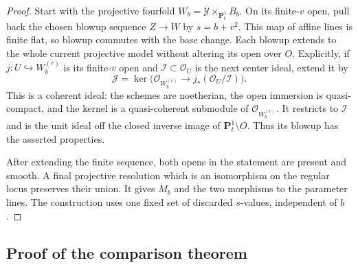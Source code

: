 \documentclass[11pt]{amsart}
\newcommand{\PP}{\mathbf P}
\theoremstyle{definition}
\theoremstyle{remark}
\numberwithin{equation}{section}
\begin{document}
\begin{proof}
Start with the projective fourfold
$W_b=\overline{\mathcal Y}\times_{\PP^1_t}B_b$.  On its finite-$v$ open,
pull back the chosen blowup sequence $Z\to W$ by $s=b+v^2$.  This map of
affine lines is finite flat, so blowup commutes with the base change.
Each blowup extends to the whole current projective model without
altering its open over $O$.  Explicitly, if $j:U\hookrightarrow W_b^{(r)}$
is its finite-$v$ open and $\mathcal I\subset\mathcal O_U$ is the next
center ideal, extend it by
\[
 \mathcal J=\ker\bigl(\mathcal O_{W_b^{(r)}}
          \longrightarrow j_*(\mathcal O_U/\mathcal I)\bigr).
\]
This is a coherent ideal: the schemes are noetherian, the open immersion
is quasi-compact, and the kernel is a quasi-coherent submodule of
$\mathcal O_{W_b^{(r)}}$.  It restricts to $\mathcal I$ and is the unit
ideal off the closed inverse image of $\PP^1_t\setminus O$.  Thus its
blowup has the asserted properties.

After extending the finite sequence, both opens in the statement are
present and smooth.  A final projective resolution which is an
isomorphism on the regular locus preserves their union.  It gives $M_b$
and the two morphisms to the parameter lines.  The construction uses one
fixed set of discarded $s$-values, independent of $b$.
\end{proof}

\subsection{Proof of the comparison theorem}
\end{document}
